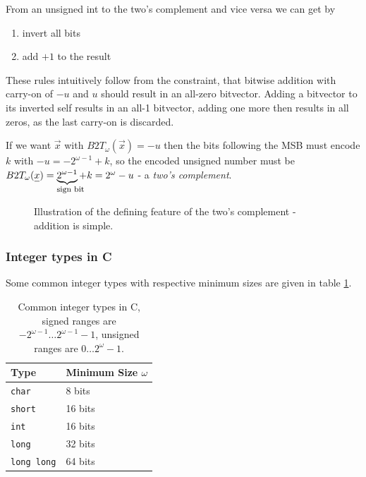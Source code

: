 From an unsigned int to the two's complement and vice versa we can get by
\begin{enumerate}
    \item invert all bits
    \item add $+1$ to the result
\end{enumerate}
These rules intuitively follow from the constraint, that bitwise addition with 
carry-on of $-u$ and $u$ should result in an all-zero bitvector. Adding a bitvector 
to its inverted self results in an all-1 bitvector, adding one more then results in 
all zeros, as the last carry-on is discarded.

If we want $\vec{x}$ with $B2T_\omega(\vec{x}) = -u$ then the bits following the MSB must encode $k$ with $-u = -2^{\omega-1} + k$,
so the encoded unsigned number must be $B2T_\omega(\vec{x}) = \explain{2^{\omega-1}}{\text{sign bit}} + k = 2^{\omega} - u$ - a \textit{two's complement}.

\begin{figure}[!htb]
 \centering
 \hfill
 \caption{Illustration of the defining feature of the two's complement - addition is simple.}
 \label{fig:tcompl}
\end{figure}

\subsubsection{Integer types in C}

Some common integer types with respective minimum sizes are given in table \ref{tab:inttypes}.

\begin{table}[!htb]
    \centering
    \begin{tabular}{l|l}
        Type & Minimum Size $\omega$ \\
        \hline
        \texttt{char} & 8 bits \\
        \texttt{short} & 16 bits\\
        \texttt{int} & 16 bits\\
        \texttt{long} & 32 bits\\
        \texttt{long long} & 64 bits\\
    \end{tabular}
    \caption{Common integer types in C, signed ranges are $-2^{\omega-1} \dots 2^{\omega-1} - 1$, unsigned ranges are $0 \dots 2^\omega - 1$.}
    \label{tab:inttypes}
\end{table}

